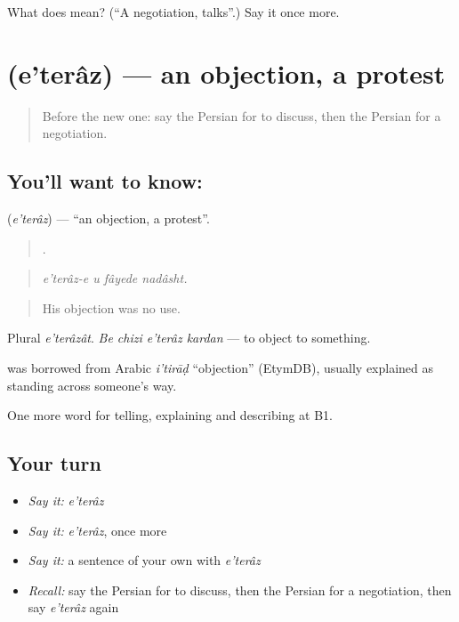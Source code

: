 \begin{tcolorbox}[breakable,colback=teal!4,colframe=teal!35!black,title={Before you move on}]
What does  mean? (\textquotedblleft{}A negotiation, talks\textquotedblright{}.) Say it once more.
\end{tcolorbox}
\section[\texorpdfstring{\fa{اعتراض} (e'terâz)}{اعتراض (e'terâz)}]{ (e'terâz) — an objection, a protest}

\label{lesson:FA-C366-eteraz}



\begin{quote}
Before the new one: say the Persian for to discuss, then the Persian for a negotiation.
\end{quote}

\subsection*{You'll want to know: }
\textbf{} (\emph{e'terâz}) — \textquotedblleft{}an objection, a protest\textquotedblright{}.

\begin{quote}
   .
\end{quote}

\begin{quote}
\emph{e'terâz-e u fâyede nadâsht.}
\end{quote}

\begin{quote}
His objection was no use.
\end{quote}

Plural \emph{e'terâzât}. \emph{Be chizi e'terâz kardan} — to object to something.

\begin{cousinweb}
\textbf{} was borrowed from Arabic \emph{i'tirāḍ} \textquotedblleft{}objection\textquotedblright{} (EtymDB), usually explained as standing across someone's way.
\end{cousinweb}

\begin{grammarlens}[title={What you've built}]
One more word for telling, explaining and describing at B1.
\end{grammarlens}

\subsection*{Your turn}
\begin{itemize}
\raggedright
  \item \emph{Say it:} \emph{e'terâz}
  \item \emph{Say it:} \emph{e'terâz}, once more
  \item \emph{Say it:} a sentence of your own with \emph{e'terâz}
  \item \emph{Recall:} say the Persian for to discuss, then the Persian for a negotiation, then say \emph{e'terâz} again
\end{itemize}


